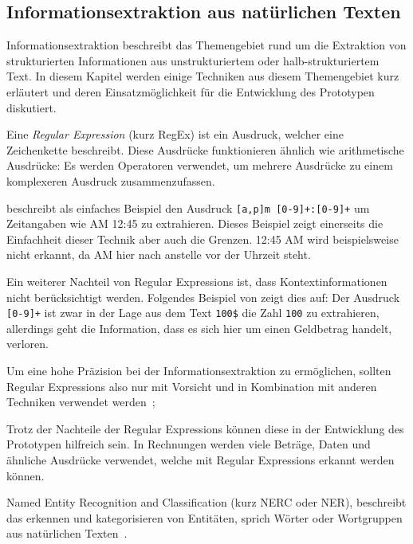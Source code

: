 \subsection{Informationsextraktion aus natürlichen Texten}


Informationsextraktion beschreibt das Themengebiet rund um die Extraktion von strukturierten Informationen aus unstrukturiertem oder halb-strukturiertem Text. In diesem Kapitel werden einige Techniken aus diesem Themengebiet kurz erläutert und deren Ein\-satz\-mög\-lich\-keit für die Entwicklung des Prototypen diskutiert.

Eine \textit{Regular Expression} (kurz RegEx) ist ein Ausdruck, welcher eine Zeichenkette beschreibt. Diese Ausdrücke funktionieren ähnlich wie arithmetische Ausdrücke: Es werden Operatoren verwendet, um mehrere Ausdrücke zu einem komplexeren Ausdruck zusammenzufassen\autocite{Xiao2004}.

\textcite{Xiao2004} beschreibt als einfaches Beispiel den Ausdruck \texttt{[a,p]m [0-9]+:[0-9]+} um Zeitangaben wie AM 12:45 zu extrahieren. Dieses Beispiel zeigt einerseits die Einfachheit dieser Technik aber auch die Grenzen. 12:45 AM wird beispielsweise nicht erkannt, da AM hier nach anstelle vor der Uhrzeit steht. 

Ein weiterer Nachteil von Regular Expressions ist, dass Kontextinformationen nicht be\-rück\-sich\-tigt werden. Folgendes Beispiel von \textcite{Xiao2004} zeigt dies auf: Der Ausdruck \texttt{[0-9]+} ist zwar in der Lage aus dem Text \texttt{100\$} die Zahl \texttt{100} zu extrahieren, allerdings geht die Information, dass es sich hier um einen Geldbetrag handelt, verloren.

Um eine hohe Präzision bei der Informationsextraktion zu ermöglichen, sollten Regular Expressions also nur mit Vorsicht und in Kombination mit anderen Techniken verwendet werden~\autocite{Xiao2004};

Trotz der Nachteile der Regular Expressions können diese in der Entwicklung des Prototypen hilfreich sein. In Rechnungen werden viele Beträge, Daten und ähnliche Ausdrücke verwendet, welche mit Regular Expressions erkannt werden können.

Named Entity Recognition and Classification (kurz NERC oder NER), beschreibt das erkennen und kategorisieren von Entitäten, sprich Wörter oder Wortgruppen aus natürlichen Texten~\autocite{Nadeau2007}.

